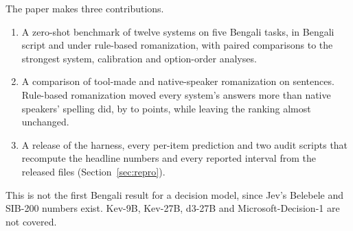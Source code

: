 \documentclass[11pt]{article}
\begin{document}
The paper makes three contributions.
\begin{enumerate}
\item A zero-shot benchmark of twelve systems on five Bengali tasks, in Bengali script and under rule-based romanization, with paired comparisons to the strongest system, calibration and option-order analyses.
\item A comparison of tool-made and native-speaker romanization on \dakN{} sentences. Rule-based romanization moved every system's answers more than native speakers' spelling did, by \dakRuleDiffMin{} to \dakRuleDiffMax{} points, while leaving the ranking almost unchanged.
\item A release of the harness, every per-item prediction and two audit scripts that recompute the headline numbers and every reported interval from the released files (Section~\ref{sec:repro}).
\end{enumerate}
This is not the first Bengali result for a decision model, since Jev's Belebele and SIB-200 numbers exist.
Kev-9B, Kev-27B, d3-27B and Microsoft-Decision-1 are not covered.
\end{document}
